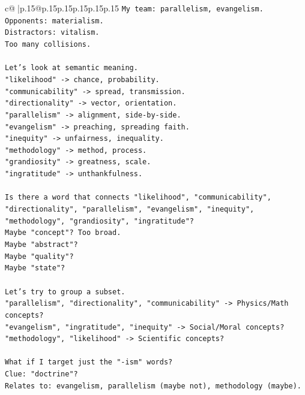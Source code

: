 \documentclass{article}
\begin{document}
{\begin{supertabular}{c@{$\;$}|p{.15\linewidth}@{}p{.15\linewidth}p{.15\linewidth}p{.15\linewidth}p{.15\linewidth}p{.15\linewidth}}
{{{\texttt{My team: parallelism, evangelism.} \\
\texttt{Opponents: materialism.} \\
\texttt{Distractors: vitalism.} \\
\texttt{Too many collisions.} \\
\\ 
\texttt{Let's look at semantic meaning.} \\
\texttt{"likelihood" {-}> chance, probability.} \\
\texttt{"communicability" {-}> spread, transmission.} \\
\texttt{"directionality" {-}> vector, orientation.} \\
\texttt{"parallelism" {-}> alignment, side{-}by{-}side.} \\
\texttt{"evangelism" {-}> preaching, spreading faith.} \\
\texttt{"inequity" {-}> unfairness, inequality.} \\
\texttt{"methodology" {-}> method, process.} \\
\texttt{"grandiosity" {-}> greatness, scale.} \\
\texttt{"ingratitude" {-}> unthankfulness.} \\
\\ 
\texttt{Is there a word that connects "likelihood", "communicability", "directionality", "parallelism", "evangelism", "inequity", "methodology", "grandiosity", "ingratitude"?} \\
\texttt{Maybe "concept"? Too broad.} \\
\texttt{Maybe "abstract"?} \\
\texttt{Maybe "quality"?} \\
\texttt{Maybe "state"?} \\
\\ 
\texttt{Let's try to group a subset.} \\
\texttt{"parallelism", "directionality", "communicability" {-}> Physics/Math concepts?} \\
\texttt{"evangelism", "ingratitude", "inequity" {-}> Social/Moral concepts?} \\
\texttt{"methodology", "likelihood" {-}> Scientific concepts?} \\
\\ 
\texttt{What if I target just the "{-}ism" words?} \\
\texttt{Clue: "doctrine"?} \\
\texttt{Relates to: evangelism, parallelism (maybe not), methodology (maybe).} \\
}}}
\end{supertabular}}
\end{document}
